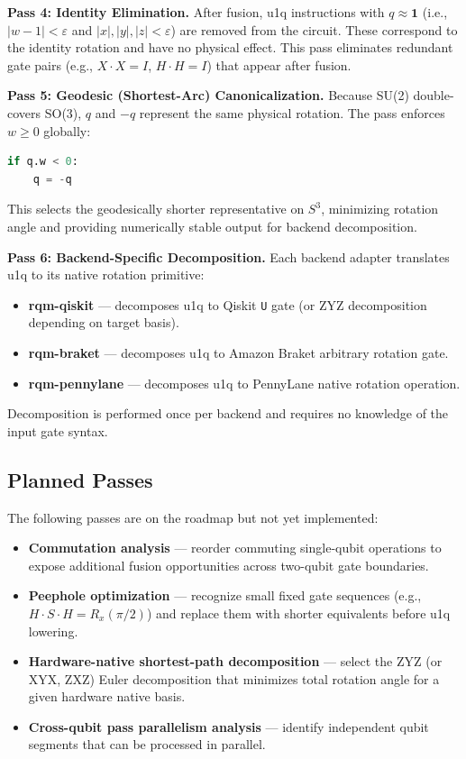 \documentclass[conference]{IEEEtran}
\begin{document}
\textbf{Pass 4: Identity Elimination.}
After fusion, u1q instructions with $q \approx \mathbf{1}$ (i.e., $|w - 1| < \varepsilon$ and
$|x|, |y|, |z| < \varepsilon$) are removed from the circuit. These correspond to the identity
rotation and have no physical effect. This pass eliminates redundant gate pairs (e.g.,
$X{\cdot}X = I$, $H{\cdot}H = I$) that appear after fusion.

\textbf{Pass 5: Geodesic (Shortest-Arc) Canonicalization.}
Because SU(2) double-covers SO(3), $q$ and $-q$ represent the same physical rotation. The
pass enforces $w \geq 0$ globally:
\begin{lstlisting}[language=Python]
if q.w < 0:
    q = -q
\end{lstlisting}
This selects the geodesically shorter representative on $S^3$, minimizing rotation angle and
providing numerically stable output for backend decomposition.

\textbf{Pass 6: Backend-Specific Decomposition.}
Each backend adapter translates u1q to its native rotation primitive:
\begin{itemize}
\item \textbf{rqm-qiskit} --- decomposes u1q to Qiskit \texttt{U} gate (or ZYZ decomposition
depending on target basis).
\item \textbf{rqm-braket} --- decomposes u1q to Amazon Braket arbitrary rotation gate.
\item \textbf{rqm-pennylane} --- decomposes u1q to PennyLane native rotation operation.
\end{itemize}
Decomposition is performed once per backend and requires no knowledge of the input gate syntax.

\subsection{Planned Passes}

The following passes are on the roadmap but not yet implemented:

\begin{itemize}
\item \textbf{Commutation analysis} --- reorder commuting single-qubit operations to expose
additional fusion opportunities across two-qubit gate boundaries.
\item \textbf{Peephole optimization} --- recognize small fixed gate sequences (e.g.,
$H{\cdot}S{\cdot}H = R_x(\pi/2)$) and replace them with shorter equivalents before u1q
lowering.
\item \textbf{Hardware-native shortest-path decomposition} --- select the ZYZ (or XYX, ZXZ)
Euler decomposition that minimizes total rotation angle for a given hardware native basis.
\item \textbf{Cross-qubit pass parallelism analysis} --- identify independent qubit segments
that can be processed in parallel.
\end{itemize}
\end{document}
